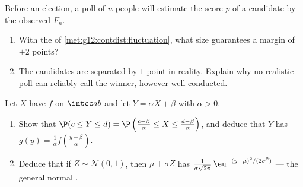 \begin{exercise}[$\star\star\star$]\label{exo:g12:contdist:8}
Before an election, a poll of $n$ people will estimate the score $p$ of a
candidate by the observed  $F_n$.
\begin{enumerate}
  \item With the  of
        \cref{met:g12:contdist:fluctuation}, what  size guarantees a
        margin of $\pm 2$ points?
  \item The candidates are separated by $1$ point in reality. Explain why
        no realistic poll can reliably call the winner, however well
        conducted.
\end{enumerate}
\end{exercise}

\begin{exercise}[$\star\star\star$]\label{exo:g12:contdist:9}
Let $X$ have  $f$ on $\intcc ab$ and let
$Y = \alpha X + \beta$ with $\alpha > 0$.
\begin{enumerate}
  \item Show that $\P(c \leq Y \leq d)
        = \P\left(\frac{c - \beta}{\alpha} \leq X \leq
        \frac{d-\beta}{\alpha}\right)$, and deduce that $Y$ has 
        $g(y) = \frac{1}{\alpha} f\left(\frac{y - \beta}{\alpha}\right)$.
  \item Deduce that if $Z \sim \mathcal N(0,1)$, then
        $\mu + \sigma Z$ has 
        $\frac{1}{\sigma\sqrt{2\pi}}\,
        \eu^{-(y - \mu)^2/(2\sigma^2)}$ --- the general normal .
\end{enumerate}
\end{exercise}
